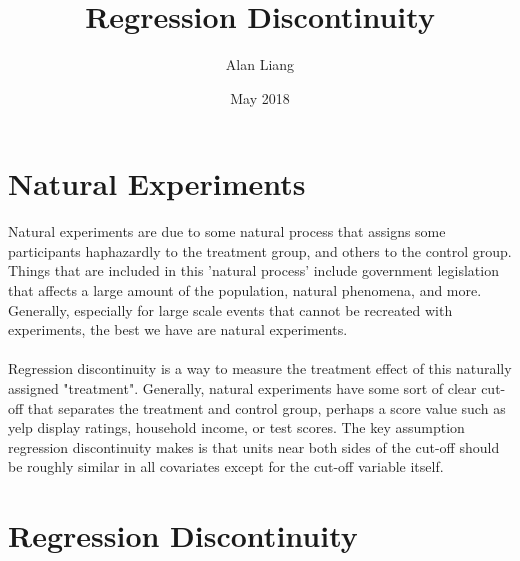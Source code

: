 \documentclass{article}
\title{Regression Discontinuity}
\author{Alan Liang}
\date{May 2018}
\begin{document}
\maketitle
\section{Natural Experiments}
Natural experiments are due to some natural process that assigns some participants haphazardly to the treatment group, and others to the control group.
Things that are included in this 'natural process' include government legislation that affects a large amount of the population, natural phenomena, and more.
Generally, especially for large scale events that cannot be recreated with experiments, the best we have are natural experiments.
\\\\
Regression discontinuity is a way to measure the treatment effect of this naturally assigned "treatment".
Generally, natural experiments have some sort of clear cut-off that separates the treatment and control group, perhaps a score value such as yelp display ratings, household income, or test scores.
The key assumption regression discontinuity makes is that units near both sides of the cut-off should be roughly similar in all covariates except for the cut-off variable itself. 

\section{Regression Discontinuity}
\end{document}

